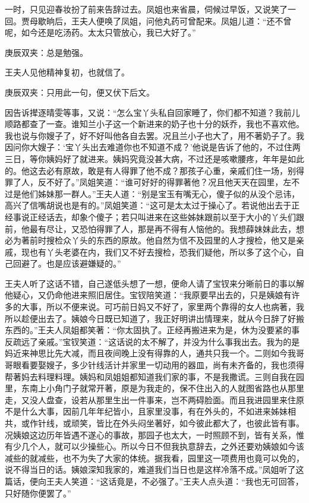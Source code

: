 \begin{parag}
    一时，只见迎春妆扮了前来告辞过去。凤姐也来省晨，伺候过早饭，又说笑了一回。贾母歇晌后，王夫人便唤了凤姐，问他丸药可曾配来。凤姐儿道：“还不曾呢，如今还是吃汤药。太太只管放心，我已大好了。”\begin{note}庚辰双夹：总是勉强。\end{note}王夫人见他精神复初，也就信了。\begin{note}庚辰双夹：只用此一句，便又伏下后文。\end{note}因告诉撵逐晴雯等事，又说：“怎么宝丫头私自回家睡了，你们都不知道？我前儿顺路都查了一查。谁知兰小子这一个新进来的奶子也十分的妖乔，我也不喜欢他。我也说与你嫂子了，好不好叫他各自去罢。况且兰小子也大了，用不著奶子了。我因问你大嫂子：‘宝丫头出去难道你也不知道不成？’他说是告诉了他的，不过住两三日，等你姨妈好了就进来。姨妈究竟没甚大病，不过还是咳嗽腰疼，年年是如此的。他这去必有原故，敢是有人得罪了他不成？那孩子心重，亲戚们住一场，别得罪了人，反不好了。”凤姐笑道：“谁可好好的得罪著他？况且他天天在园里，左不过是他们姊妹那一群人。”王夫人道：“别是宝玉有嘴无心，傻子似的从没个忌讳，高兴了信嘴胡说也是有的。”凤姐笑道：“这可是太太过于操心了。若说他出去于正经事说正经话去，却象个傻子；若只叫进来在这些姊妹跟前以至于大小的丫头们跟前，他最有尽让，又恐怕得罪了人，那是再不得有人恼他的。我想薛妹妹此去，想必为著前时搜检众丫头的东西的原故。他自然为信不及园里的人才搜检，他又是亲戚，现也有丫头老婆在内，我们又不好去搜检，恐我们疑他，所以多了这个心，自己回避了。也是应该避嫌疑的。”
\end{parag}


\begin{parag}
    王夫人听了这话不错，自己遂低头想了一想，便命人请了宝钗来分晰前日的事以解他疑心，又仍命他进来照旧居住。宝钗陪笑道：“我原要早出去的，只是姨娘有许多的大事，所以不便来说。可巧前日妈又不好了，家里两个靠得的女人也病著，我所以趁便出去了。姨娘今日既已知道了，我正好明讲出情理来，就从今日辞了好搬东西的。”王夫人凤姐都笑著：“你太固执了。正经再搬进来为是，休为没要紧的事反疏远了亲戚。”宝钗笑道：“这话说的太不解了，并没为什么事我出去。我为的是妈近来神思比先大减，而且夜间晚上没有得靠的人，通共只我一个。二则如今我哥哥眼看要娶嫂子，多少针线活计并家里一切动用的器皿，尚有未齐备的，我也须得帮著妈去料理料理。姨妈和凤姐姐都知道我们家的事，不是我撒谎。三则自我在园里，东南上小角门子就常开著，原是为我走的，保不住出入的人就图省路也从那里走，又没人盘查，设若从那里生出一件事来，岂不两碍脸面。而且我进园里来住原不是什么大事，因前几年年纪皆小，且家里没事，有在外头的，不如进来姊妹相共，或作针线，或顽笑，皆比在外头闷坐著好，如今彼此都大了，也彼此皆有事。况姨娘这边历年皆遇不遂心的事故，那园子也太大，一时照顾不到，皆有关系，惟有少几个人，就可以少操些心。所以今日不但我执意辞去，之外还要劝姨娘如今该减些的就减些，也不为失了大家的体统。据我看，园里这一项费用也竟可以免的，说不得当日的话。姨娘深知我家的，难道我们当日也是这样冷落不成。”凤姐听了这篇话，便向王夫人笑道：“这话竟是，不必强了。”王夫人点头道：“我也无可回答，只好随你便罢了。”
\end{parag}


